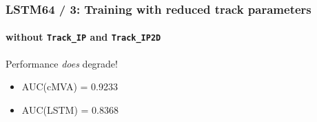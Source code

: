 \documentclass{beamer}
\begin{document}
\begin{frame}
  \frametitle{LSTM64 / 3: Training with reduced track parameters}
  \framesubtitle{without \texttt{Track\_IP} and \texttt{Track\_IP2D}}

  \begin{figure}
    \centering
  \end{figure}

  Performance \textsl{does} degrade!
  \begin{itemize}
  \item AUC(cMVA) = 0.9233
  \item AUC(LSTM) = 0.8368
  \end{itemize}
  
\end{frame}
\end{document}
